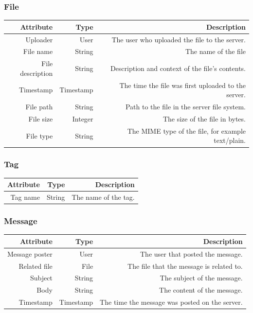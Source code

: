 \documentclass[10pt,a4paper]{article}
\begin{document}
\subsubsection{File}
\begin{tabularx}{\textwidth}{|R|R|R|} \hline
\textbf{Attribute} & \textbf{Type} & \textbf{Description}\\ \hline
Uploader & User & The user who uploaded the file to the server.\\ \hline
File name & String & The name of the file\\ \hline
File description & String & Description and context of the file's contents.\\ \hline
Timestamp & Timestamp & The time the file was first uploaded to the server.\\ \hline
File path & String & Path to the file in the server file system.\\ \hline
File size & Integer & The size of the file in bytes.\\ \hline
File type & String & The MIME type of the file, for example text/plain.\\ \hline
\end{tabularx}

\subsubsection{Tag}
\begin{tabularx}{\textwidth}{|R|R|R|} \hline
\textbf{Attribute} & \textbf{Type} & \textbf{Description}\\ \hline
Tag name & String & The name of the tag.\\ \hline
\end{tabularx}

\subsubsection{Message}
\begin{tabularx}{\textwidth}{|R|R|R|} \hline
\textbf{Attribute} & \textbf{Type} & \textbf{Description}\\ \hline
Message poster & User & The user that posted the message.\\ \hline
Related file & File & The file that the message is related to.\\ \hline
Subject & String & The subject of the message.\\ \hline
Body & String & The content of the message.\\ \hline
Timestamp & Timestamp & The time the message was posted on the server.\\ \hline
\end{tabularx}
\end{document}
